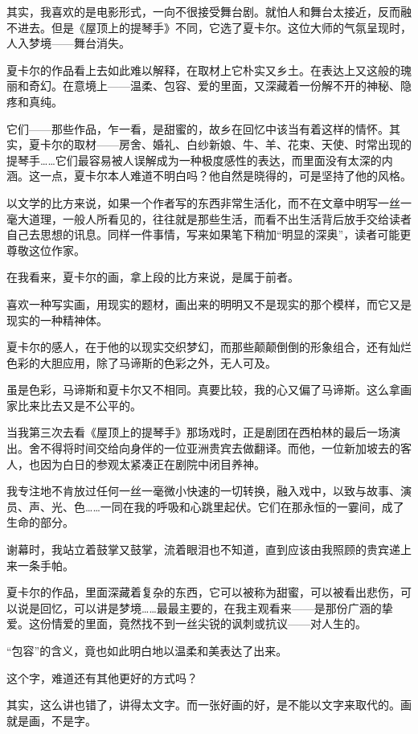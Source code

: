 \par 其实，我喜欢的是电影形式，一向不很接受舞台剧。就怕人和舞台太接近，反而融不进去。但是《屋顶上的提琴手》不同，它选了夏卡尔。这位大师的气氛呈现时，人入梦境——舞台消失。
\par 夏卡尔的作品看上去如此难以解释，在取材上它朴实又乡土。在表达上又这般的瑰丽和奇幻。在意境上——温柔、包容、爱的里面，又深藏着一份解不开的神秘、隐疼和真纯。
\par 它们——那些作品，乍一看，是甜蜜的，故乡在回忆中该当有着这样的情怀。其实，夏卡尔的取材——房舍、婚礼、白纱新娘、牛、羊、花束、天使、时常出现的提琴手……它们最容易被人误解成为一种极度感性的表达，而里面没有太深的内涵。这一点，夏卡尔本人难道不明白吗？他自然是晓得的，可是坚持了他的风格。
\par 以文学的比方来说，如果一个作者写的东西非常生活化，而不在文章中明写一丝一毫大道理，一般人所看见的，往往就是那些生活，而看不出生活背后放手交给读者自己去思想的讯息。同样一件事情，写来如果笔下稍加“明显的深奥”，读者可能更尊敬这位作家。
\par 在我看来，夏卡尔的画，拿上段的比方来说，是属于前者。
\par 喜欢一种写实画，用现实的题材，画出来的明明又不是现实的那个模样，而它又是现实的一种精神体。
\par 夏卡尔的感人，在于他的以现实交织梦幻，而那些颠颠倒倒的形象组合，还有灿烂色彩的大胆应用，除了马谛斯的色彩之外，无人可及。
\par 虽是色彩，马谛斯和夏卡尔又不相同。真要比较，我的心又偏了马谛斯。这么拿画家比来比去又是不公平的。
\par 当我第三次去看《屋顶上的提琴手》那场戏时，正是剧团在西柏林的最后一场演出。舍不得将时间交给向身伴的一位亚洲贵宾去做翻译。而他，一位新加坡去的客人，也因为白日的参观太紧凑正在剧院中闭目养神。
\par 我专注地不肯放过任何一丝一毫微小快速的一切转换，融入戏中，以致与故事、演员、声、光、色……一同在我的呼吸和心跳里起伏。它们在那永恒的一霎间，成了生命的部分。
\par 谢幕时，我站立着鼓掌又鼓掌，流着眼泪也不知道，直到应该由我照顾的贵宾递上来一条手帕。
\par 夏卡尔的作品，里面深藏着复杂的东西，它可以被称为甜蜜，可以被看出悲伤，可以说是回忆，可以讲是梦境……最最主要的，在我主观看来——是那份广涵的挚爱。这份情爱的里面，竟然找不到一丝尖锐的讽刺或抗议——对人生的。
\par “包容”的含义，竟也如此明白地以温柔和美表达了出来。
\par 这个字，难道还有其他更好的方式吗？
\par 其实，这么讲也错了，讲得太文字。而一张好画的好，是不能以文字来取代的。画就是画，不是字。
